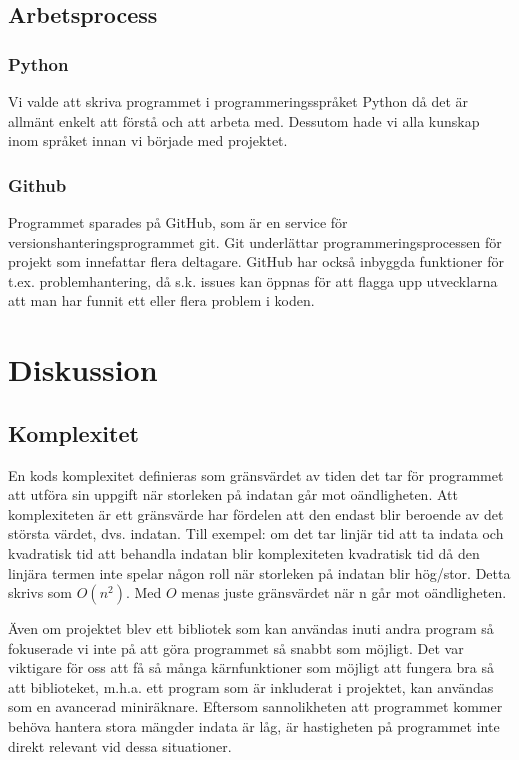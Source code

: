 \documentclass[12pt,a4paper]{article}
\begin{document}
\subsection{Arbetsprocess}
\subsubsection{Python}
Vi valde att skriva programmet i programmeringsspråket Python då det är allmänt enkelt att förstå och att arbeta med. Dessutom hade vi alla kunskap inom språket innan vi började med projektet.

\subsubsection{Github}
Programmet sparades på GitHub, som är en service för versionshanteringsprogrammet git. Git underlättar programmeringsprocessen för projekt som innefattar flera deltagare. GitHub har också inbyggda funktioner för t.ex. problemhantering, då s.k. issues kan öppnas för att flagga upp utvecklarna att man har funnit ett eller flera problem i koden.

\section{Diskussion}
\subsection{Komplexitet}
\label{subsec:Komplexitet}
En kods komplexitet definieras som gränsvärdet av tiden det tar för programmet att utföra sin uppgift när storleken på indatan går mot oändligheten. Att komplexiteten är ett gränsvärde har fördelen att den endast blir beroende av det största värdet, dvs. indatan. Till exempel: om det tar linjär tid att ta indata och kvadratisk tid att behandla indatan blir komplexiteten kvadratisk tid då den linjära termen inte spelar någon roll när storleken på indatan blir hög/stor. Detta skrivs som \(O(n^2)\). Med \(O\) menas juste gränsvärdet när n går mot oändligheten.
\par
Även om projektet blev ett bibliotek som kan användas inuti andra program så fokuserade vi inte på att göra programmet så snabbt som möjligt. Det var viktigare för oss att få så många kärnfunktioner som möjligt att fungera bra så att biblioteket, m.h.a. ett program som är inkluderat i projektet, kan användas som en avancerad miniräknare. Eftersom sannolikheten att programmet kommer behöva hantera stora mängder indata är låg, är hastigheten på programmet inte direkt relevant vid dessa situationer. 
\end{document}
